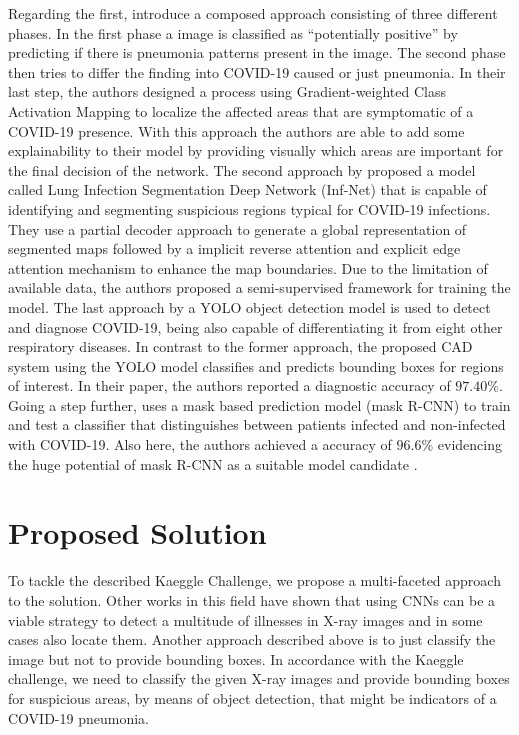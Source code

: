 Regarding the first, \citeauthor{brunese2020explainable} \autocite{brunese2020explainable} introduce a composed approach consisting of three different phases. In the first phase a image is classified as \enquote{potentially positive} by predicting if there is pneumonia patterns present in the image. The second phase then tries to differ the finding into COVID-19 caused or just pneumonia. In their last step, the authors designed a process using Gradient-weighted Class Activation Mapping to localize the affected areas that are symptomatic of a COVID-19 presence. With this approach the authors are able to add some explainability to their model by providing visually which areas are important for the final decision of the network.\newline
The second approach by \citeauthor{fan2020inf} \autocite{fan2020inf} proposed a model called Lung Infection Segmentation Deep Network (Inf-Net) that is capable of identifying and segmenting suspicious regions typical for COVID-19 infections. They use a partial decoder approach to generate a global representation of segmented maps followed by a implicit reverse attention and explicit edge attention mechanism to enhance the map boundaries. Due to the limitation of available data, the authors proposed a semi-supervised framework for training the model.\newline
The last approach by \citeauthor{al2021fast} \autocite{al2021fast} a \ac{YOLO} object detection model \autocite{yoloOriginal} is used to detect and diagnose COVID-19, being also capable of differentiating it from eight other respiratory diseases. In contrast to the former approach, the proposed \ac{CAD} system using the \ac{YOLO} model classifies and predicts bounding boxes for regions of interest. In their paper, the authors reported a diagnostic accuracy of $97.40\%$.
Going a step further, \citeauthor{podder_efficient_2021} uses a mask based prediction model (mask R-CNN) to train and test a classifier that distinguishes between patients infected and non-infected with COVID-19. Also here, the authors achieved a accuracy of $96.6\%$ evidencing the huge potential of mask R-CNN as a suitable model candidate \autocite{podder_efficient_2021}.




\section{Proposed Solution}

To tackle the described Kaeggle Challenge, we propose a multi-faceted approach to the solution. Other works in this field have shown that using \acp{CNN} can be a viable strategy to detect a multitude of illnesses in X-ray images and in some cases also locate them. Another approach described above is to just classify the image but not to provide bounding boxes. In accordance with the Kaeggle challenge, we need to classify the given X-ray images and provide bounding boxes for suspicious areas, by means of object detection, that might be indicators of a COVID-19 pneumonia.

